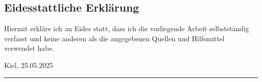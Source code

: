 \subsection*{Eidesstattliche Erklärung}

\vspace{0.5cm}

\noindent Hiermit erkläre ich an Eides statt, dass ich die vorliegende Arbeit selbstständig verfasst und keine anderen als die angegebenen Quellen und Hilfsmittel verwendet habe.

\bigskip\noindent Kiel, 25.05.2025
\vskip 10mm
\hfill\rule{18em}{.3pt}%
\vfill
